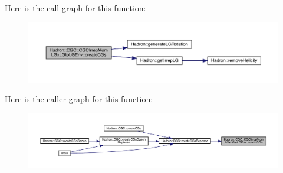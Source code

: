 Here is the call graph for this function\+:\nopagebreak
\begin{figure}[H]
\begin{center}
\leavevmode
\includegraphics[width=350pt]{dd/d8a/namespaceHadron_1_1CGC_1_1CGCIrrepMomLGxLGtoLGEnv_aac28a74a71012455c31bc9ba558b35da_cgraph}
\end{center}
\end{figure}
Here is the caller graph for this function\+:\nopagebreak
\begin{figure}[H]
\begin{center}
\leavevmode
\includegraphics[width=350pt]{dd/d8a/namespaceHadron_1_1CGC_1_1CGCIrrepMomLGxLGtoLGEnv_aac28a74a71012455c31bc9ba558b35da_icgraph}
\end{center}
\end{figure}
